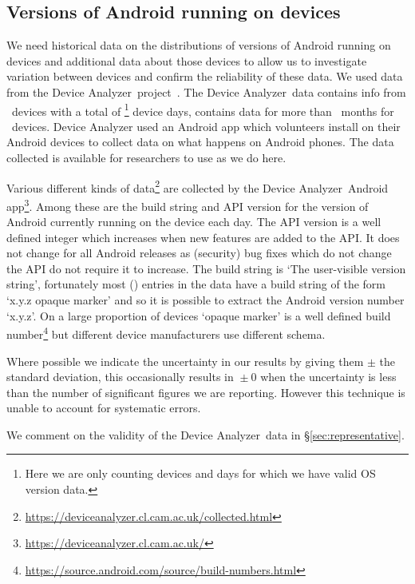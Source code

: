 \documentclass[conference,a4paper,twoside]{IEEEtran}
\newcommand{\da}{Device Analyzer}
\newcommand{\daNumDevices}{\daNumOSDevices}
\newcommand{\daDeviceDays}{\daOSTotalDaysData}
\begin{document}
\subsection{Versions of Android running on devices}
We need historical data on the distributions of versions of Android running on devices and additional data about those devices to allow us to investigate variation between devices and confirm the reliability of these data.
We used data from the \da\ project~\cite{Wagner2013}.
The \da\ data contains info from \daNumDevices\ devices with a total of \daDeviceDays\footnote{Here we are only counting devices and days for which we have valid OS version data.} device days, contains data for more than \daMonths\ months for \daMonthsDevices\ devices.
Device Analyzer used an Android app which volunteers install on their Android devices to collect data on what happens on Android phones.
The data collected is available for researchers to use as we do here.

Various different kinds of data\footnote{\url{https://deviceanalyzer.cl.cam.ac.uk/collected.html}} are collected by the \da\ Android app\footnote{\url{https://deviceanalyzer.cl.cam.ac.uk/}}.
Among these are the build string and API version for the version of Android currently running on the device each day.
The API version is a well defined integer which increases when new features are added to the API.
It does not change for all Android releases as (security) bug fixes which do not change the API do not require it to increase.
The build string is `The user-visible version string', fortunately most (\daOSVersionPercValidLines) entries in the data have a build string of the form `x.y.z opaque marker' and so it is possible to extract the Android version number `x.y.z'.
On a large proportion of devices `opaque marker' is a well defined build number\footnote{\url{https://source.android.com/source/build-numbers.html}} but different device manufacturers use different schema.

Where possible we indicate the uncertainty in our results by giving them $\pm$ the standard deviation, this occasionally results in ${} \pm 0$ when the uncertainty is less than the number of significant figures we are reporting.
However this technique is unable to account for systematic errors.

We comment on the validity of the \da\ data in \S\ref{sec:representative}.
\end{document}
